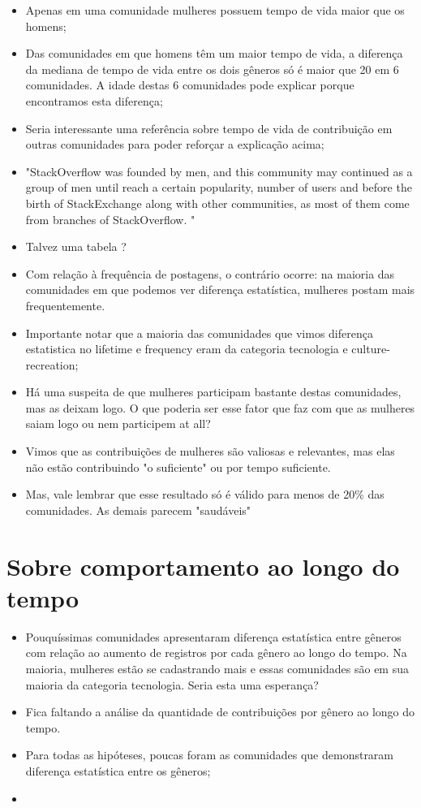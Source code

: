 \begin{itemize}
	\item Apenas em uma comunidade mulheres possuem tempo de vida maior que os homens;
	\item Das comunidades em que homens têm um maior tempo de vida, a diferença da mediana de tempo de vida entre os dois gêneros só é maior que 20 em 6 comunidades. A idade destas 6 comunidades pode explicar porque encontramos esta diferença;
	\item Seria interessante uma referência sobre tempo de vida de contribuição em outras comunidades para poder reforçar a explicação acima;
	\item "StackOverflow was founded by men, and this community may continued as a group of men until reach a certain popularity, number of users and before the birth of StackExchange along with other communities, as most of them come from branches of StackOverflow. "
	\item Talvez uma tabela ?
	\item Com relação à frequência de postagens, o contrário ocorre: na maioria das comunidades em que podemos ver diferença estatística, mulheres postam mais frequentemente. 
	\item Importante notar que a maioria das comunidades que vimos diferença estatistica no lifetime e frequency eram da categoria tecnologia e culture-recreation;
	\item Há uma suspeita de que mulheres participam bastante destas comunidades, mas as deixam logo. O que poderia ser esse fator que faz com que as mulheres saiam logo ou nem participem at all? 
	\item Vimos que as contribuições de mulheres são valiosas e relevantes, mas elas não estão contribuindo "o suficiente" ou por tempo suficiente.
	\item Mas, vale lembrar que esse resultado só é válido para menos de 20\% das comunidades. As demais parecem "saudáveis"
\end{itemize}

\section{Sobre comportamento ao longo do tempo}

\begin{itemize}
	\item Pouquíssimas comunidades apresentaram diferença estatística entre gêneros com relação ao aumento de registros por cada gênero ao longo do tempo. Na maioria, mulheres estão se cadastrando mais e essas comunidades são em sua maioria da categoria tecnologia. Seria esta uma esperança?
	\item Fica faltando a análise da quantidade de contribuições por gênero ao longo do tempo.
\end{itemize}

\begin{itemize}
	\item Para todas as hipóteses, poucas foram as comunidades que demonstraram diferença estatística entre os gêneros;
	\item 
\end{itemize}